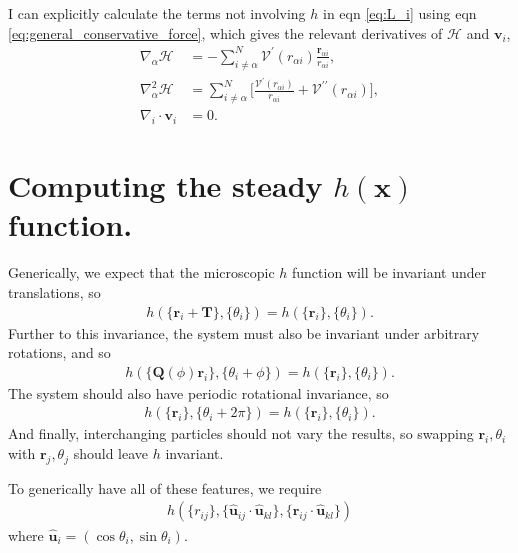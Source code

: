 \documentclass[twocolumn,amsmath,amssymb,aps]{revtex4-1}%
\begin{document}
I can explicitly calculate the terms not involving $h$ in eqn \ref{eq:L_i}
using eqn \ref{eq:general_conservative_force}, which gives the relevant
derivatives of $\mathcal{H}$ and $\bm{v}_i$,
\begin{subequations}
  \label{eqs:partials_of_L_i}
  \begin{align}
    \nabla_{\alpha}\mathcal{H}
    &=-\sum_{i\neq\alpha}^N\mathcal{V}^{\prime}
    (r_{\alpha i})\frac{\bm{r}_{\alpha i}}{r_{\alpha i}},
    \label{eq:partial_H_of_L_i}\\
    \nabla_{\alpha}^2\mathcal{H}
    &=\sum_{i\neq\alpha}^N\bigg[\frac{\mathcal{V}^{\prime}
        (r_{\alpha i})}{r_{\alpha i}}
      +\mathcal{V}^{\prime\prime}(r_{\alpha i})\bigg],
    \label{eq:partialsq_H_of_L_i}\\
    \nabla_i\cdot \bm{v}_i
    &= 0.\label{eq:partial_v_of_L_i}
  \end{align}
\end{subequations}

\section{Computing the steady $h(\bm{x})$ function.}

Generically, we expect that the microscopic $h$ function will be invariant
under translations, so
\begin{align}
  h(\{\bm{r}_i+\bm{T}\},\{\theta_i\}) = h(\{\bm{r}_i\},\{\theta_i\}).
\end{align}
Further to this invariance, the system must also be invariant
under arbitrary rotations, and so
\begin{align}
  h(\{\bm{Q}(\phi)\bm{r}_i\},\{\theta_i+\phi\})
  =h(\{\bm{r}_i\},\{\theta_i\}).
\end{align}
The system should also have periodic rotational invariance, so
\begin{align}
  h(\{\bm{r}_i\},\{\theta_i+2\pi\})
    =h(\{\bm{r}_i\},\{\theta_i\}).
\end{align}
And finally, interchanging particles should not vary the results, so swapping
$\bm{r}_i,\theta_i$ with $\bm{r}_j,\theta_j$ should leave $h$ invariant.

To generically have all of these features, we require
\begin{align}
  h(\{r_{ij}\},\{\bm{\hat{u}}_{ij}\cdot\bm{\hat{u}}_{kl}\},
  \{\bm{r}_{ij}\cdot\bm{\hat{u}}_{kl}\})
\end{align}
where $\bm{\hat{u}}_i = (\cos\theta_i,\sin\theta_i)$.
\end{document}
